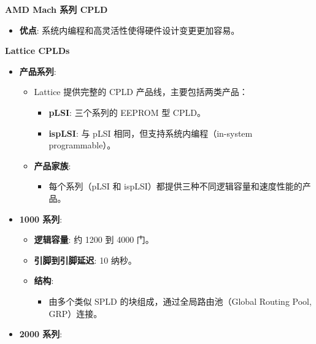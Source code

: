 \documentclass[
  ignorenonframetext,
  chinese,
]{beamer}
\providecommand{\tightlist}{%
  \setlength{\itemsep}{0pt}\setlength{\parskip}{0pt}}
\begin{document}
\begin{frame}
\begin{block}{\textbf{AMD Mach 系列 CPLD}}
\begin{itemize}
\begin{itemize}
    \begin{itemize}
    \tightlist
    \item
      乘积项分配器使得与门平面的乘积项可以在或门之间灵活共享。
    \item
      输出交换矩阵增强了引脚分配的灵活性。
    \end{itemize}
  \item
    \textbf{优点}: 系统内编程和高灵活性使得硬件设计变更更加容易。
  \end{itemize}
\end{itemize}
\end{block}

\begin{block}{\textbf{Lattice CPLDs}}
\label{lattice-cplds}
\begin{itemize}
\tightlist
\item
  \textbf{产品系列}:

  \begin{itemize}
  \tightlist
  \item
    Lattice 提供完整的 CPLD 产品线，主要包括两类产品：

    \begin{itemize}
    \tightlist
    \item
      \textbf{pLSI}: 三个系列的 EEPROM 型 CPLD。
    \item
      \textbf{ispLSI}: 与 pLSI 相同，但支持系统内编程（in-system
      programmable）。
    \end{itemize}
  \item
    \textbf{产品家族}:

    \begin{itemize}
    \tightlist
    \item
      每个系列（pLSI 和 ispLSI）都提供三种不同逻辑容量和速度性能的产品。
    \end{itemize}
  \end{itemize}
\item
  \textbf{1000 系列}:

  \begin{itemize}
  \tightlist
  \item
    \textbf{逻辑容量}: 约 1200 到 4000 门。
  \item
    \textbf{引脚到引脚延迟}: 10 纳秒。
  \item
    \textbf{结构}:

    \begin{itemize}
    \tightlist
    \item
      由多个类似 SPLD 的块组成，通过全局路由池（Global Routing Pool,
      GRP）连接。
    \end{itemize}
  \end{itemize}
\item
  \textbf{2000 系列}:


\end{itemize}
\end{block}
\end{frame}
\end{document}
